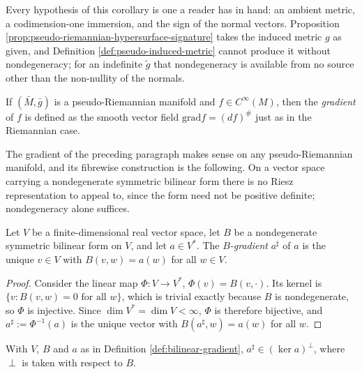 Every hypothesis of this corollary is one a reader has in hand: an ambient metric, a codimension-one immersion, and the sign of the normal vectors. Proposition \ref{prop:pseudo-riemannian-hypersurface-signature} takes the induced metric $g$ as given, and Definition \ref{def:pseudo-induced-metric} cannot produce it without nondegeneracy; for an indefinite $\tilde{g}$ that nondegeneracy is available from no source other than the non-nullity of the normals.

If $(\bar{M}, \bar{g})$ is a pseudo-Riemannian manifold and $f \in C^\infty(M)$, then the \emph{gradient} of $f$ is defined as the smooth vector field $\text{grad} f = (df)^\#$ just as in the Riemannian case.

The gradient of the preceding paragraph makes sense on any pseudo-Riemannian manifold, and its fibrewise construction is the following. On a vector space carrying a nondegenerate symmetric bilinear form there is no Riesz representation to appeal to, since the form need not be positive definite; nondegeneracy alone suffices.

\begin{definition}
\label{def:bilinear-gradient}
\leanok
{}
Let $V$ be a finite-dimensional real vector space, let $B$ be a nondegenerate symmetric bilinear form on $V$, and let $a \in V^*$. The \emph{$B$-gradient} $a^\sharp$ of $a$ is the unique $v \in V$ with $B(v, w) = a(w)$ for all $w \in V$.
\end{definition}

\begin{proof}
\leanok
{}
Consider the linear map $\Phi : V \to V^*$, $\Phi(v) = B(v,\cdot)$. Its kernel is $\{v : B(v,w) = 0 \text{ for all } w\}$, which is trivial exactly because $B$ is nondegenerate, so $\Phi$ is injective. Since $\dim V^* = \dim V < \infty$, $\Phi$ is therefore bijective, and $a^\sharp := \Phi^{-1}(a)$ is the unique vector with $B(a^\sharp, w) = a(w)$ for all $w$.
\end{proof}

\begin{lemma}
\label{lem:bilinear-gradient-orthogonal-ker}
\leanok
{}
With $V$, $B$ and $a$ as in Definition \ref{def:bilinear-gradient}, $a^\sharp \in (\ker a)^\perp$, where $\perp$ is taken with respect to $B$.
\end{lemma}

